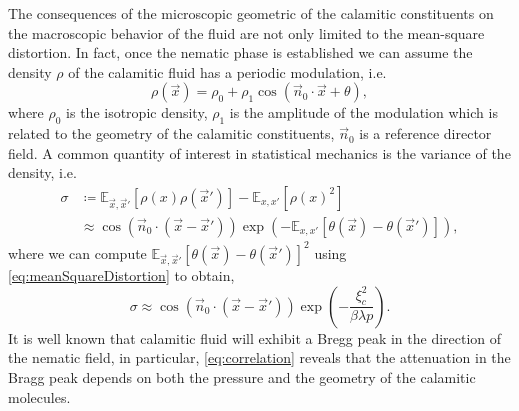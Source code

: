 \documentclass[%
 aip,
 amsmath,amssymb,
 reprint,%
]{revtex4-1}
\begin{document}
The consequences of the microscopic geometric of the calamitic constituents on the macroscopic behavior of the fluid are not only limited to the mean-square distortion. In fact, once the nematic phase is established we can assume the density $\rho$ of the calamitic fluid has a periodic modulation, i.e. 
\begin{equation}
  \rho(\vec{x}) = \rho_0 + \rho_1\cos(\vec{n}_0\cdot \vec{x}+\theta),
\end{equation}
where $\rho_0$ is the isotropic density, $\rho_1$ is the amplitude of the modulation which is related to the geometry of the calamitic constituents, $\vec{n}_0$ is a reference director field.
A common quantity of interest in statistical mechanics is the variance of the density, i.e.
\begin{align}
  \sigma &\coloneqq \mathbb{E}_{\vec{x},\vec{x}'}\left[\rho(x)\rho(\vec{x}')\right] - \mathbb{E}_{x,x'}\left[\rho(x)^2\right]  \nonumber \\
  &\approx \cos\left(\vec{n}_0\cdot (\vec{x}-\vec{x}')\right)\exp\left(-\mathbb{E}_{x,x'}\left[\theta(\vec{x})-\theta(\vec{x}')\right]\right),
\end{align}
where we can compute $\mathbb{E}_{\vec{x},\vec{x}'} \left[\theta(\vec{x})-\theta(\vec{x}')\right]^2$ using \eqref{eq:meanSquareDistortion} to obtain,
\begin{equation}
  \label{eq:correlation}
  \sigma \approx \cos(\vec{n}_0\cdot(\vec{x}-\vec{x}'))\exp\left(-\frac{\xi_c^2}{\beta \lambda p}\right).
\end{equation}
It is well known that calamitic fluid will exhibit a Bregg peak in the direction of the nematic field, in particular, \eqref{eq:correlation} reveals that the attenuation in the Bragg peak depends on both the pressure and the geometry of the calamitic molecules.

\end{document}
